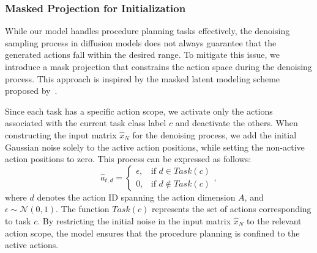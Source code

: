 \subsubsection{Masked Projection for Initialization}
\label{method22}


While our model handles procedure planning tasks effectively, the denoising sampling process in diffusion models does not always guarantee that the generated actions fall within the desired range. To mitigate this issue, we introduce a mask projection that constrains the action space during the denoising process. This approach is inspired by the masked latent modeling scheme proposed by~\citet{gao2023masked}.


Since each task has a specific action scope, we activate only the actions associated with the current task class label $c$ and deactivate the others. When constructing the input matrix $\hat{x}_N$ for the denoising process, we add the initial Gaussian noise solely to the active action positions, while setting the non-active action positions to zero. This process can be expressed as follows:
\begin{equation}
\hat{a}_{t,d} = 
\begin{cases} 
      \epsilon, & \text{if } d \in Task(c) \\
      0, & \text{if } d \notin Task(c)
\end{cases},
\end{equation}
where $d$ denotes the action ID spanning the action dimension $A$, and $\epsilon \sim \mathcal{N}(0,1)$. The function $Task(c)$ represents the set of actions corresponding to task $c$. By restricting the initial noise in the input matrix $\hat{x}_N$ to the relevant action scope, the model ensures that the procedure planning is confined to the active actions.

